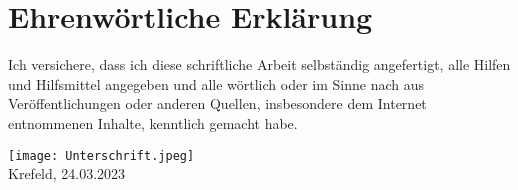 \section*{Ehrenwörtliche Erklärung}
Ich versichere, dass ich diese schriftliche Arbeit selbständig angefertigt, alle Hilfen
und Hilfsmittel angegeben und alle wörtlich oder im Sinne nach aus
Veröffentlichungen oder anderen Quellen, insbesondere dem Internet entnommenen
Inhalte, kenntlich gemacht habe.

\noindent 

\texttt{[image: Unterschrift.jpeg]} \\
Krefeld, 24.03.2023

